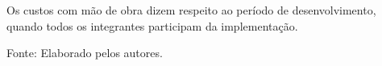 \documentclass[
    12pt,               %
    openright,          %
    oneside,
    a4paper,            %
    BIBLATEX,           %
    TODO,               %
    english,            %
    brazil              %
    ]{ifsp-spo-inf-ctds}
\begin{document}
            Os custos com mão de obra dizem respeito ao período de desenvolvimento, quando todos os integrantes participam da implementação.

            \begin{table}[h]
                \centering
                 \caption{Custos de mão de obra mensal. Em R\$}

                \label{tab:custos-maodeobra}
                \centering
                \footnotesize Fonte: Elaborado pelos autores.
            \end{table} 


\end{document}

